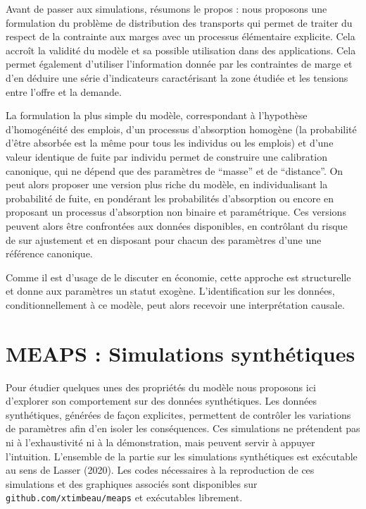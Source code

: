 \documentclass[
  10pt,
  a4paper,
  numbers=noendperiod,
  DIV=9]{scrreprt}
\begin{document}
Avant de passer aux simulations, résumons le propos : nous proposons une
formulation du problème de distribution des transports qui permet de
traiter du respect de la contrainte aux marges avec un processus
élémentaire explicite. Cela accroît la validité du modèle et sa possible
utilisation dans des applications. Cela permet également d'utiliser
l'information donnée par les contraintes de marge et d'en déduire une
série d'indicateurs caractérisant la zone étudiée et les tensions entre
l'offre et la demande.

La formulation la plus simple du modèle, correspondant à l'hypothèse
d'homogénéité des emplois, d'un processus d'absorption homogène (la
probabilité d'être absorbée est la même pour tous les individus ou les
emplois) et d'une valeur identique de fuite par individu permet de
construire une calibration canonique, qui ne dépend que des paramètres
de ``masse'' et de ``distance''. On peut alors proposer une version plus
riche du modèle, en individualisant la probabilité de fuite, en
pondérant les probabilités d'absorption ou encore en proposant un
processus d'absorption non binaire et paramétrique. Ces versions peuvent
alors être confrontées aux données disponibles, en contrôlant du risque
de sur ajustement et en disposant pour chacun des paramètres d'une une
référence canonique.

Comme il est d'usage de le discuter en économie, cette approche est
structurelle et donne aux paramètres un statut exogène. L'identification
sur les données, conditionnellement à ce modèle, peut alors recevoir une
interprétation causale.


\hypertarget{meaps-simulations-synthuxe9tiques}{%
\chapter{MEAPS : Simulations
synthétiques}\label{meaps-simulations-synthuxe9tiques}}

Pour étudier quelques unes des propriétés du modèle nous proposons ici
d'explorer son comportement sur des données synthétiques. Les données
synthétiques, générées de façon explicites, permettent de contrôler les
variations de paramètres afin d'en isoler les conséquences. Ces
simulations ne prétendent pas ni à l'exhaustivité ni à la démonstration,
mais peuvent servir à appuyer l'intuition. L'ensemble de la partie sur
les simulations synthétiques est exécutable au sens de Lasser (2020).
Les codes nécessaires à la reproduction de ces simulations et des
graphiques associés sont disponibles sur
\texttt{github.com/xtimbeau/meaps} et exécutables librement.
\end{document}
